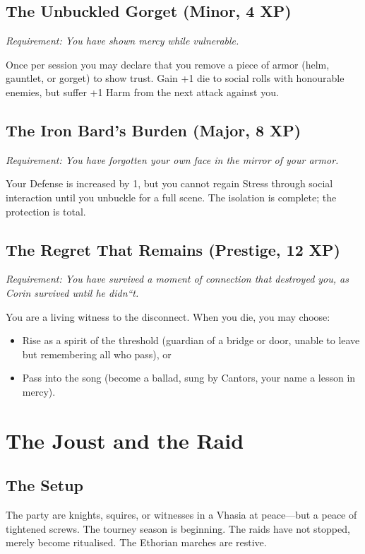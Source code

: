 \documentclass[11pt,twoside]{book}
\begin{document}
\section{The Unbuckled Gorget (Minor, 4 XP)}
\emph{Requirement: You have shown mercy while vulnerable.}

Once per session you may declare that you remove a piece of armor (helm, gauntlet, or gorget) to show trust.  Gain +1 die to social rolls with honourable enemies, but suffer +1 Harm from the next attack against you.

\section{The Iron Bard's Burden (Major, 8 XP)}
\emph{Requirement: You have forgotten your own face in the mirror of your armor.}

Your Defense is increased by 1, but you cannot regain Stress through social interaction until you unbuckle for a full scene.  The isolation is complete; the protection is total.

\section{The Regret That Remains (Prestige, 12 XP)}
\emph{Requirement: You have survived a moment of connection that destroyed you, as Corin survived until he didn``t.}

You are a living witness to the disconnect.  When you die, you may choose:

\begin{itemize}
  \item Rise as a spirit of the threshold (guardian of a bridge or door, unable to leave but remembering all who pass), or
  \item Pass into the song (become a ballad, sung by Cantors, your name a lesson in mercy).
\end{itemize}

\chapter{The Joust and the Raid}\label{ch:campaign}

\section{The Setup}
The party are knights, squires, or witnesses in a Vhasia at peace---but a peace of tightened screws.  The tourney season is beginning.  The raids have not stopped, merely become ritualised.  The Ethorian marches are restive.
\end{document}
